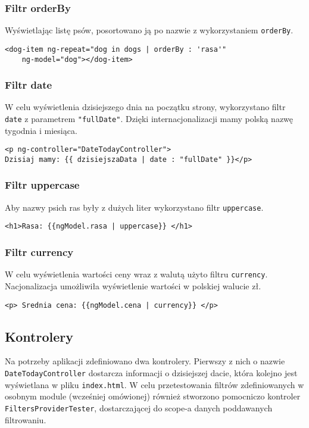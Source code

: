 \documentclass{article}
\begin{document}
\subsubsection{Filtr orderBy}
Wyświetlając listę psów, posortowano ją po nazwie z wykorzystaniem \verb|orderBy|.
\begin{lstlisting}[frame=single]
<dog-item ng-repeat="dog in dogs | orderBy : 'rasa'" 
	ng-model="dog"></dog-item>
\end{lstlisting}

\subsubsection{Filtr date}
W celu wyświetlenia dzisiejszego dnia na początku strony, wykorzystano filtr \verb|date| z parametrem \verb|"fullDate"|.  Dzięki internacjonalizacji mamy polską nazwę tygodnia i miesiąca.
\begin{lstlisting}[frame=single]  
<p ng-controller="DateTodayController">
Dzisiaj mamy: {{ dzisiejszaData | date : "fullDate" }}</p>
\end{lstlisting}

\subsubsection{Filtr uppercase}
Aby nazwy psich ras były z dużych liter wykorzystano filtr \verb|uppercase|. 
\begin{lstlisting}[frame=single]  
<h1>Rasa: {{ngModel.rasa | uppercase}} </h1>
\end{lstlisting}

\subsubsection{Filtr currency}
W celu wyświetlenia wartości ceny wraz z walutą użyto filtru \verb|currency|. Nacjonalizacja umożliwiła wyświetlenie wartości w polskiej walucie zł.
 
\begin{lstlisting}[frame=single]  
<p> Srednia cena: {{ngModel.cena | currency}} </p>
\end{lstlisting}

\subsection{Kontrolery}

Na potrzeby aplikacji zdefiniowano dwa kontrolery. Pierwszy z nich o nazwie \verb|DateTodayController| dostarcza informacji o dzisiejszej dacie, która kolejno jest wyświetlana w pliku \verb|index.html|. W celu przetestowania filtrów zdefiniowanych w osobnym module (wcześniej omówionej) również stworzono pomocniczo kontroler \verb|FiltersProviderTester|, dostarczającej do scope-a danych poddawanych filtrowaniu. 
\end{document}
